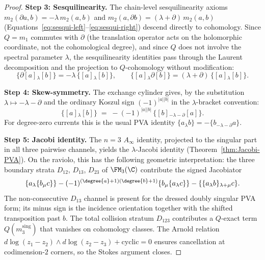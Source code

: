 \begin{proof}
\medskip\noindent\textbf{Step 3: Sesquilinearity.}
The chain-level sesquilinearity axioms $m_2(\partial a, b) = -\lambda\, m_2(a,b)$ and $m_2(a, \partial b) = (\lambda+\partial)\,m_2(a,b)$ (Equations~\ref{eq:sesqui-left}--\ref{eq:sesqui-right}) descend directly to cohomology. Since $Q=m_1$ commutes with $\partial$ (the translation operator acts on the holomorphic coordinate, not the cohomological degree), and since $Q$ does not involve the spectral parameter $\lambda$, the sesquilinearity identities pass through the Laurent decomposition and the projection to $Q$-cohomology without modification:
\[
 \{\partial[a]{}_\lambda [b]\} = -\lambda\,\{[a]{}_\lambda [b]\}, \qquad
 \{[a]{}_\lambda \partial[b]\} = (\lambda+\partial)\,\{[a]{}_\lambda [b]\}.
\]

\medskip\noindent\textbf{Step 4: Skew-symmetry.}
The exchange cylinder gives, by the substitution
$\lambda\mapsto -\lambda-\partial$ and the ordinary Koszul sign
$(-1)^{|a||b|}$ in the $\lambda$-bracket convention:
\[
 \{[a]{}_\lambda [b]\} \;=\; -(-1)^{|a||b|}\,\{[b]{}_{-\lambda-\partial} [a]\}.
\]
For degree-zero currents this is the usual PVA identity
$\{a_\lambda b\}=-\{b_{-\lambda-\partial}a\}$.

\medskip\noindent\textbf{Step 5: Jacobi identity.}
The $n=3$ $A_\infty$ identity, projected to the singular part in all three pairwise channels, yields the $\lambda$-Jacobi identity (Theorem~\ref{thm:Jacobi-PVA}). On the raviolo, this has the following geometric interpretation: the three boundary strata $D_{12}$, $D_{13}$, $D_{23}$ of $\FM_3(\C)$ contribute the signed Jacobiator
\[
\{a_\lambda\{b_\mu c\}\}
-
(-1)^{(\degree{a}+1)(\degree{b}+1)}
\{b_\mu\{a_\lambda c\}\}
-
\{\{a_\lambda b\}_{\lambda+\mu}c\}.
\]
The non-consecutive \(D_{13}\) channel is present for the dressed
doubly singular PVA form; its minus sign is the incidence orientation
together with the shifted transposition past \(b\). The total collision
stratum \(D_{123}\) contributes a \(Q\)-exact term
\(Q(m_3^{\mathrm{sing}})\) that vanishes on cohomology classes. The
Arnold relation \(d\log(z_1-z_2)\wedge d\log(z_2-z_3)+\text{cyclic}=0\)
ensures cancellation at codimension-\(2\) corners, so the Stokes
argument closes.


\end{proof}
